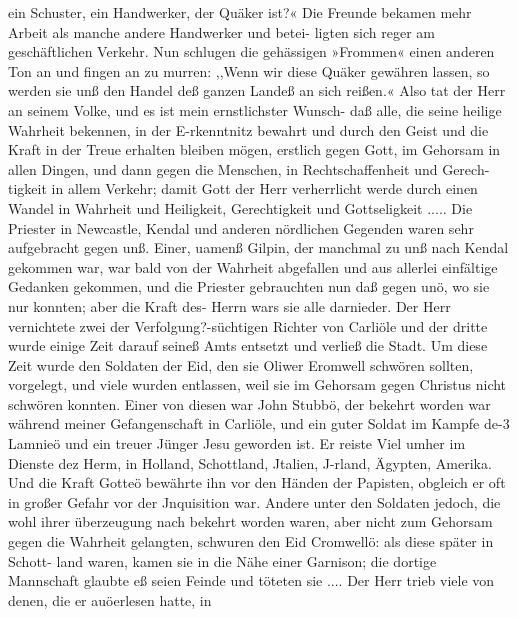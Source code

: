 ein Schuster, ein Handwerker, der Quäker ist?« Die Freunde
bekamen mehr Arbeit als manche andere Handwerker und betei-
ligten sich reger am geschäftlichen Verkehr. Nun schlugen die
gehässigen »Frommen« einen anderen Ton an und fingen an zu
murren: ,,Wenn wir diese Quäker gewähren lassen, so werden sie
unß den Handel deß ganzen Landeß an sich reißen.« Also tat
der Herr an seinem Volke, und es ist mein ernstlichster Wunsch-
daß alle, die seine heilige Wahrheit bekennen, in der E-rkenntnitz
bewahrt und durch den Geist und die Kraft in der Treue erhalten
bleiben mögen, erstlich gegen Gott, im Gehorsam in allen Dingen,
und dann gegen die Menschen, in Rechtschaffenheit und Gerech-
tigkeit in allem Verkehr; damit Gott der Herr verherrlicht werde
durch einen Wandel in Wahrheit und Heiligkeit, Gerechtigkeit und
Gottseligkeit .....
Die Priester in Newcastle, Kendal und anderen nördlichen
Gegenden waren sehr aufgebracht gegen unß. Einer, uamenß
Gilpin, der manchmal zu unß nach Kendal gekommen war, war
bald von der Wahrheit abgefallen und aus allerlei einfältige
Gedanken gekommen, und die Priester gebrauchten nun daß gegen
unö, wo sie nur konnten; aber die Kraft des- Herrn wars sie
alle darnieder. Der Herr vernichtete zwei der Verfolgung?-süchtigen
Richter von Carliöle und der dritte wurde einige Zeit darauf
seineß Amts entsetzt und verließ die Stadt.
Um diese Zeit wurde den Soldaten der Eid, den sie Oliwer
Eromwell schwören sollten, vorgelegt, und viele wurden entlassen,
weil sie im Gehorsam gegen Christus nicht schwören konnten.
Einer von diesen war John Stubbö, der bekehrt worden war
während meiner Gefangenschaft in Carliöle, und ein guter Soldat
im Kampfe de-3 Lamnieö und ein treuer Jünger Jesu geworden
ist. Er reiste Viel umher im Dienste dez Herm, in Holland,
Schottland, Jtalien, J-rland, Ägypten, Amerika. Und die Kraft
Gotteö bewährte ihn vor den Händen der Papisten, obgleich er
oft in großer Gefahr vor der Jnquisition war. Andere unter
den Soldaten jedoch, die wohl ihrer überzeugung nach bekehrt
worden waren, aber nicht zum Gehorsam gegen die Wahrheit
gelangten, schwuren den Eid Cromwellö: als diese später in Schott-
land waren, kamen sie in die Nähe einer Garnison; die dortige
Mannschaft glaubte eß seien Feinde und töteten sie ....
Der Herr trieb viele von denen, die er auöerlesen hatte, in


